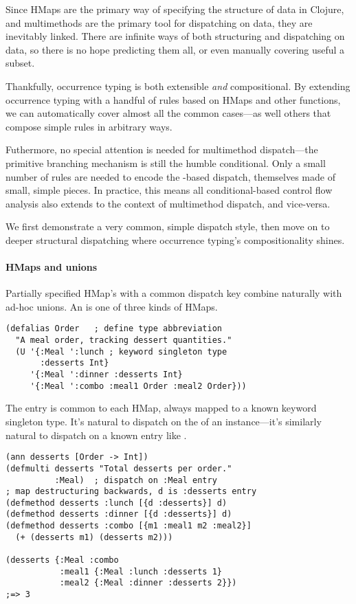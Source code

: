 Since HMaps are the primary way of specifying the structure of data in Clojure,
and multimethods are the primary tool for dispatching on data, they are inevitably
linked.
There are infinite ways of both structuring and dispatching on data, so there is no
hope predicting them all, or even manually covering useful a subset.

Thankfully, occurrence typing is both extensible \emph{and} compositional.
By extending occurrence typing with
a handful of rules based on HMaps and other functions, 
we can automatically cover almost all the common cases---as well others
that compose simple rules in arbitrary ways.

Futhermore, no special attention is needed for multimethod dispatch---the primitive branching
mechanism is still the humble  conditional. Only a small number of rules are needed
to encode the -based dispatch, themselves made of small, simple pieces.
In practice, this means all conditional-based control flow analysis
also extends to the context of multimethod dispatch, and vice-versa.

We first demonstrate a very common, simple dispatch style,
then move on to deeper structural dispatching where occurrence typing's
compositionality shines.

\paragraph{HMaps and unions} Partially specified HMap's with a common dispatch key
combine naturally with ad-hoc unions.
An  is one of three kinds of HMaps.

\begin{verbatim}
(defalias Order   ; define type abbreviation
  "A meal order, tracking dessert quantities."
  (U '{:Meal ':lunch ; keyword singleton type
       :desserts Int}
     '{:Meal ':dinner :desserts Int}
     '{:Meal ':combo :meal1 Order :meal2 Order}))
\end{verbatim}

The  entry is common to each HMap, always mapped to a known keyword singleton
type.
It's natural to dispatch on the  of an instance---it's similarly
natural to dispatch on a known entry like .

\begin{exmp}
\begin{verbatim}
(ann desserts [Order -> Int])
(defmulti desserts "Total desserts per order."
          :Meal)  ; dispatch on :Meal entry
; map destructuring backwards, d is :desserts entry
(defmethod desserts :lunch [{d :desserts}] d)
(defmethod desserts :dinner [{d :desserts}] d)
(defmethod desserts :combo [{m1 :meal1 m2 :meal2}]
  (+ (desserts m1) (desserts m2)))

(desserts {:Meal :combo 
           :meal1 {:Meal :lunch :desserts 1}
           :meal2 {:Meal :dinner :desserts 2}})
;=> 3
\end{verbatim}
\label{example:desserts-on-meal}
\end{exmp}


